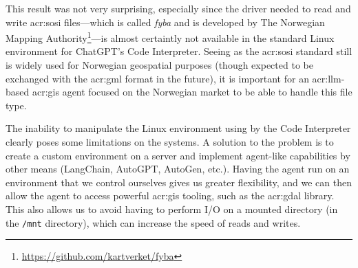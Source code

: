 This result was not very surprising, especially since the driver needed to read and write \acrshort{acr:sosi} files---which is called \textit{fyba} and is developed by The Norwegian Mapping Authority\footnote{\url{https://github.com/kartverket/fyba}}---is almost certaintly not available in the standard Linux environment for ChatGPT's Code Interpreter. Seeing as the \acrshort{acr:sosi} standard still is widely used for Norwegian geospatial purposes (though expected to be exchanged with the \acrshort{acr:gml} format in the future), it is important for an \acrshort{acr:llm}-based \acrshort{acr:gis} agent focused on the Norwegian market to be able to handle this file type.

The inability to manipulate the Linux environment using by the Code Interpreter clearly poses some limitations on the systems. A solution to the problem is to create a custom environment on a server and implement agent-like capabilities by other means (LangChain, AutoGPT, AutoGen, etc.). Having the agent run on an environment that we control ourselves gives us greater flexibility, and we can then allow the agent to access powerful \acrshort{acr:gis} tooling, such as the \acrshort{acr:gdal} library. This also allows us to avoid having to perform I/O on a mounted directory (in the \texttt{/mnt} directory), which can increase the speed of reads and writes.

\glsaddall